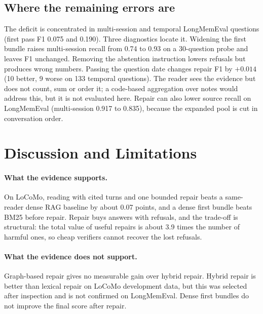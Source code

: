 \documentclass[10pt]{article}
\theoremstyle{plain}
\begin{document}
\subsection{Where the remaining errors are}
\label{sec:errors}

The deficit is concentrated in multi-session and temporal LongMemEval questions (first pass F1 0.075 and 0.190).
Three diagnostics locate it. Widening the first bundle raises multi-session recall from 0.74 to 0.93 on a
30-question probe and leaves F1 unchanged. Removing the abstention instruction lowers refusals but produces
wrong numbers. Passing the question date changes repair F1 by $+0.014$ (10 better, 9 worse on 133 temporal
questions). The reader sees the evidence but does not count, sum or order it; a code-based aggregation over
notes would address this, but it is not evaluated here. Repair can also lower source recall on LongMemEval
(multi-session 0.917 to 0.835), because the expanded pool is cut in conversation order.

\section{Discussion and Limitations}
\label{sec:discussion}

\paragraph{What the evidence supports.} On LoCoMo, reading with cited turns and one bounded repair beats a
same-reader dense RAG baseline by about 0.07 points, and a dense first bundle beats BM25 before repair.
Repair buys answers with refusals, and the trade-off is structural: the total value of useful repairs is about
3.9 times the number of harmful ones, so cheap verifiers cannot recover the lost refusals.

\paragraph{What the evidence does not support.} Graph-based repair gives no measurable gain over hybrid repair.
Hybrid repair is better than lexical repair on LoCoMo development data, but this was selected after inspection
and is not confirmed on LongMemEval. Dense first bundles do not improve the final score after repair.
\end{document}

